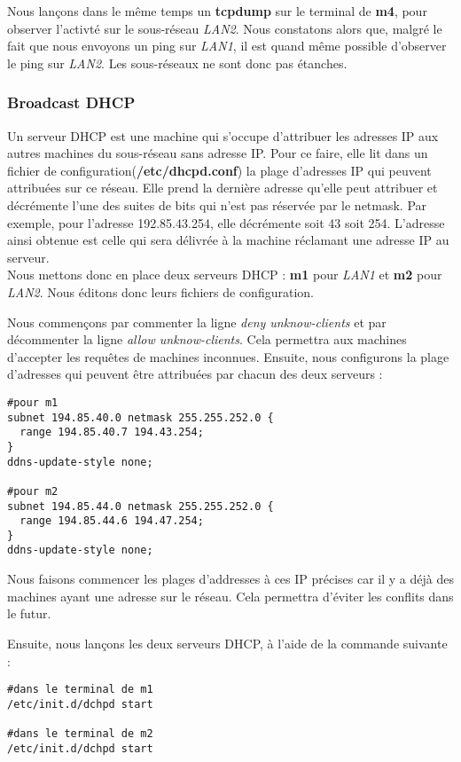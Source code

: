 \documentclass{article}
\begin{document}
Nous lançons dans le même temps un \textbf{tcpdump} sur le terminal de \textbf{m4}, pour observer l'activté sur le sous-réseau \textit{LAN2}. Nous constatons alors que, malgré le fait que nous envoyons un ping sur \textit{LAN1}, il est quand même possible d'observer le ping sur \textit{LAN2}. Les sous-réseaux ne sont donc pas étanches.

\subsubsection{Broadcast DHCP}

Un serveur DHCP est une machine qui s'occupe d'attribuer les adresses IP aux autres machines du sous-réseau sans adresse IP. Pour ce faire, elle lit dans un fichier de configuration(\textbf{/etc/dhcpd.conf}) la plage d'adresses IP qui peuvent attribuées sur ce réseau. Elle prend la dernière adresse qu'elle peut attribuer et décrémente l'une des suites de bits qui n'est pas réservée par le netmask. Par exemple, pour l'adresse 192.85.43.254, elle décrémente soit 43 soit 254. L'adresse ainsi obtenue est celle qui sera délivrée à la machine réclamant une adresse IP au serveur. \\

Nous mettons donc en place deux serveurs DHCP : \textbf{m1} pour \textit{LAN1} et \textbf{m2} pour \textit{LAN2}. Nous éditons donc leurs fichiers de configuration.

Nous commençons par commenter la ligne \textit{deny unknow-clients} et par décommenter la ligne \textit{allow unknow-clients}. Cela permettra aux machines d'accepter les requêtes de machines inconnues. Ensuite, nous configurons la plage d'adresses qui peuvent être attribuées par chacun des deux serveurs :
\begin{verbatim}
#pour m1
subnet 194.85.40.0 netmask 255.255.252.0 {
  range 194.85.40.7 194.43.254;
}
ddns-update-style none;

#pour m2
subnet 194.85.44.0 netmask 255.255.252.0 {
  range 194.85.44.6 194.47.254;
}
ddns-update-style none;
\end{verbatim}

Nous faisons commencer les plages d'addresses à ces IP précises car il y a déjà des machines ayant une adresse sur le réseau. Cela permettra d'éviter les conflits dans le futur. \newpage

Ensuite, nous lançons les deux serveurs DHCP, à l'aide de la commande suivante :
\begin{verbatim}
#dans le terminal de m1
/etc/init.d/dchpd start

#dans le terminal de m2
/etc/init.d/dchpd start
\end{verbatim}
\end{document}
